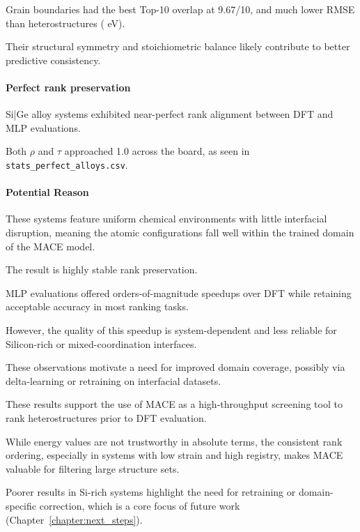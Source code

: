 
Grain boundaries had the best Top-10 overlap at 9.67/10, and much lower RMSE than heterostructures ( eV).

Their structural symmetry and stoichiometric balance likely contribute to better predictive consistency.


\paragraph{Perfect rank preservation}


Si|Ge alloy systems exhibited near-perfect rank alignment between DFT and MLP evaluations.

Both $\rho$ and $\tau$ approached 1.0 across the board, as seen in \texttt{stats\_perfect\_alloys.csv}.


\paragraph{Potential Reason}


These systems feature uniform chemical environments with little interfacial disruption, meaning the atomic
configurations fall well within the trained domain of the MACE model.

The result is highly stable rank preservation.


MLP evaluations offered orders-of-magnitude speedups over DFT while retaining acceptable accuracy in most ranking tasks.

However, the quality of this speedup is system-dependent and less reliable for Silicon-rich or mixed-coordination
interfaces.

These observations motivate a need for improved domain coverage, possibly via delta-learning or retraining on
interfacial datasets.


These results support the use of MACE as a high-throughput screening tool to rank heterostructures prior to DFT
evaluation.

While energy values are not trustworthy in absolute terms, the consistent rank ordering, especially in systems with low
strain and high registry, makes MACE valuable for filtering large structure sets.

Poorer results in Si-rich systems highlight the need for retraining or domain-specific correction, which is a core focus
of future work (Chapter~\ref{chapter:next_steps}).

